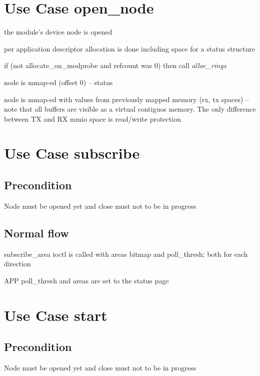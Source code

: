   \section{Use Case open\_node}
  \begin{CompactEnumerate}
    \item the module's device node is opened
    \item per application descriptor allocation is done including space for
      a status structure
    \item if (not allocate\_on\_modprobe and refcount was 0) then call
      \emph{alloc\_rings}
    \item node is mmap-ed (offset 0) -- status
    \item node is mmap-ed with values from previously mapped memory (rx, tx
      spaces) -- note that all buffers are visible as a virtual contiguos
      memory. The only difference between TX and RX mmio space is read/write
      protection
  \end{CompactEnumerate}

  \section{Use Case subscribe}
  \subsection{Precondition}
    Node must be opened yet and close must not to be in progress

  \subsection{Normal flow}
  \begin{CompactEnumerate}
    \item subscribe\_area ioctl is called with areas bitmap and poll\_thresh;
      both for each direction
    \item APP poll\_thresh and areas are set to the status page
  \end{CompactEnumerate}

  \section{Use Case start}
  \subsection{Precondition}
    Node must be opened yet and close must not to be in progress

